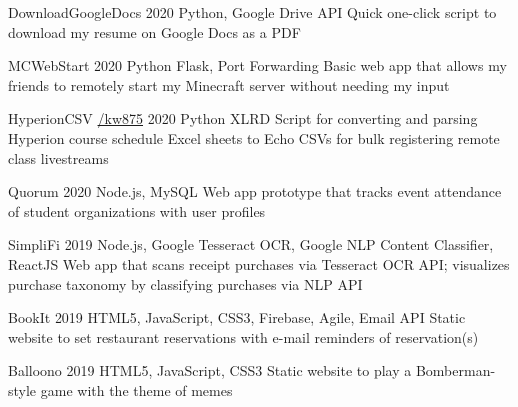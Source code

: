 

\begin{cvprojects}
  \cvproject
  {DownloadGoogleDocs} %
  {\href{https://github.com/KevinIsMyName/DownloadGoogleDocs}{\faGithubSquare\acvHeaderIconSep\@KevinIsMyName}} %
  {2020} %
  {Python, Google Drive API} %
  {Quick one-click script to download my resume on Google Docs as a PDF}

  \cvproject
  {MCWebStart} %
  {\href{https://github.com/KevinIsMyName/MCWebStart}{\faGithubSquare\acvHeaderIconSep\@KevinIsMyName}} %
  {2020} %
  {Python Flask, Port Forwarding} %
  {Basic web app that allows my friends to remotely start my Minecraft server without needing my input}

  \cvproject
  {HyperionCSV}
  {\href{https://github.com/KevinIsMyName/HyperionCSV}{\faGithubSquare\acvHeaderIconSep\@KevinIsMyName/kw875}}
  {2020}
  {Python XLRD}
  {Script for converting and parsing Hyperion course schedule Excel sheets to Echo CSVs for bulk registering remote class livestreams}

  \cvproject
  {Quorum}
  {\href{https://github.com/KevinIsMyName/Quorum}{\faGithubSquare\acvHeaderIconSep\@KevinIsMyName}}
  {2020}
  {Node.js, MySQL}
  {Web app prototype that tracks event attendance of student organizations with user profiles}

  \cvproject
  {SimpliFi}
  {\href{https://github.com/unitehenry/simply-finance}{\faGithubSquare\acvHeaderIconSep{}}}
  {2019}
  {Node.js, Google Tesseract OCR, Google NLP Content Classifier, ReactJS}
  {Web app that scans receipt purchases via Tesseract OCR API; visualizes purchase taxonomy by classifying purchases via NLP API}

  \cvproject
  {BookIt}
  {\href{https://github.com/KevinIsMyName/BookIt}{\faGithubSquare\acvHeaderIconSep{}}}
  {2019}
  {HTML5, JavaScript, CSS3, Firebase, Agile, Email API}
  {Static website to set restaurant reservations with e-mail reminders of reservation(s)}

  \cvproject
  {Balloono}
  {\href{https://github.com/KevinIsMyName/Balloono}{\faGithubSquare\acvHeaderIconSep\@KevinIsMyName}}
  {2019}
  {HTML5, JavaScript, CSS3}
  {Static website to play a Bomberman-style game with the theme of memes}
\end{cvprojects}